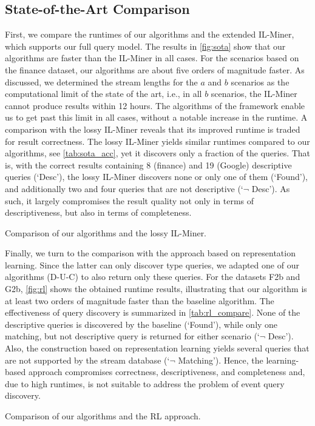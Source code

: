 \subsection{State-of-the-Art Comparison}
\label{sec:exp_sota}
First, we compare the runtimes of our algorithms and the
extended IL-Miner, which supports our full query model.
The results in \autoref{fig:sota} show that our algorithms are faster than
the IL-Miner in all cases. For the scenarios based on the finance dataset,
our algorithms are about five orders of magnitude faster. As discussed, we
determined the stream lengths for the $a$ and $b$ scenarios as the
computational limit of the state of the art, i.e., in all $b$ scenarios, the
IL-Miner cannot produce results within 12 hours. The algorithms of the
\sys{} framework enable us to get past this limit in all cases, without a
notable increase in the runtime.
A comparison with the lossy IL-Miner reveals that its improved runtime is traded
for result correctness. The lossy
IL-Miner yields similar runtimes compared to our algorithms, see
\autoref{tab:sota_acc}, yet
it discovers
only a fraction of the queries. That is, with the correct results containing 8
(finance) and 19 (Google) descriptive queries (`Desc'), the lossy IL-Miner
discovers none or only one of them (`Found'), and additionally two and four
queries that are not descriptive (`$\neg$ Desc'). As such, it largely compromises
the result quality not only in terms of descriptiveness, but also in terms of
completeness.
\begin{table}
	\footnotesize
	\caption{Comparison of our algorithms and the lossy IL-Miner.}
	\vspace{-1em}
	\label{tab:sota_acc}
	
	\vspace{-1em}
\end{table}
Finally, we turn to the comparison with the approach based on representation
learning. Since the latter can only discover type queries, we adapted one of our
algorithms (D-U-C) to also return only these queries.
For the datasets F2b and G2b, \autoref{fig:rl} shows the obtained runtime
results, illustrating that our algorithm is at least two orders of magnitude
faster than the baseline algorithm. The effectiveness of query discovery is
summarized in \autoref{tab:rl_compare}. None of the descriptive queries is
discovered by the baseline (`Found'), while only one matching, but not
descriptive query is returned for either scenario (`$\neg$ Desc'). Also, the
construction based on representation learning yields several queries that
are not supported by the stream database (`$\neg$ Matching'). Hence, the
learning-based approach compromises correctness, descriptiveness, and
completeness and, due to high runtimes, is not suitable to address the problem of
event query discovery.
\begin{table}
	\footnotesize
	\caption{Comparison of our algorithms and the RL approach.}
	\vspace{-1em}
	\label{tab:rl_compare}
	
	\vspace{-1em}
\end{table}
